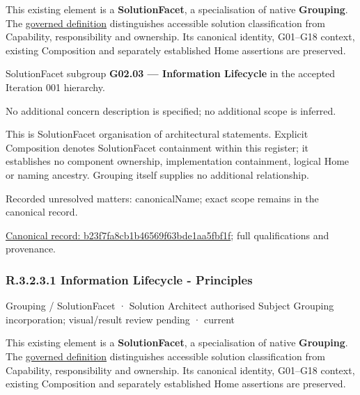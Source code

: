 This existing element is a \textbf{SolutionFacet}, a specialisation of native
\textbf{Grouping}. The \href{\detokenize{../../../../../../../governance/continuum-representation.md#solutionfacet-classification--1119-candidate}}{governed definition}
distinguishes accessible solution classification from Capability, responsibility
and ownership. Its canonical identity, G01–G18 context, existing Composition
and separately established Home assertions are preserved.



SolutionFacet subgroup \textbf{G02.03 — Information Lifecycle} in the accepted Iteration 001 hierarchy.



No additional concern description is specified; no additional scope is inferred.



This is SolutionFacet organisation of architectural statements. Explicit Composition denotes SolutionFacet containment within this register; it establishes no component ownership, implementation containment, logical Home or naming ancestry. Grouping itself supplies no additional relationship.


{\small Recorded unresolved matters: canonicalName; exact scope remains in the canonical record.}\par
{\footnotesize \href{../../../../../../../continuum/grouping/b23f7fa8cb1b46569f63bde1aa5fbf1f.md}{Canonical record: b23f7fa8cb1b46569f63bde1aa5fbf1f}; full qualifications and provenance.}\par
\subsubsection*{R.3.2.3.1 Information Lifecycle - Principles}
\label{navigation:R.3.2.3.1}

\label{element:f14ca9b3213d4c3db3c5d479b4cc938e}
{\small Grouping / SolutionFacet · Solution Architect authorised Subject Grouping incorporation; visual/result review pending · current}\par

This existing element is a \textbf{SolutionFacet}, a specialisation of native
\textbf{Grouping}. The \href{\detokenize{../../../../../../../governance/continuum-representation.md#solutionfacet-classification--1119-candidate}}{governed definition}
distinguishes accessible solution classification from Capability, responsibility
and ownership. Its canonical identity, G01–G18 context, existing Composition
and separately established Home assertions are preserved.



